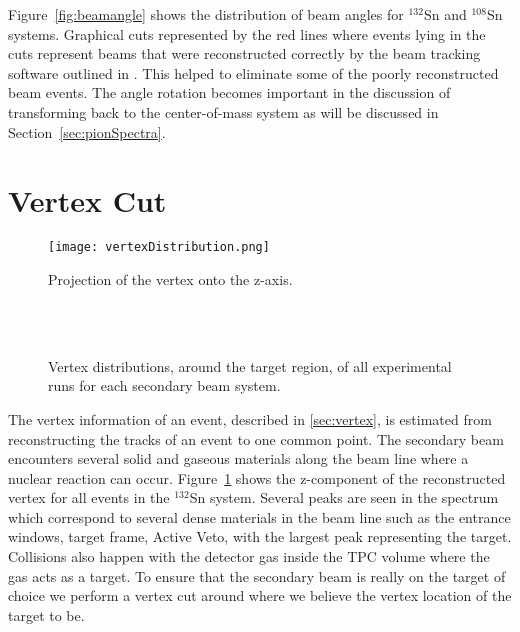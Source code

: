 Figure~\ref{fig:beamangle} shows the distribution of beam angles for ${}^{132}$Sn and ${}^{108}$Sn systems. Graphical cuts represented by the red lines where events lying in the cuts represent beams that were reconstructed correctly by the beam tracking software outlined in \cite{jon}. This helped to eliminate some of the poorly reconstructed beam events. The angle rotation becomes important in the discussion of transforming back to the center-of-mass system as will be discussed in Section~\ref{sec:pionSpectra}.



\section{Vertex Cut}
\label{sec:vertexcut}

\begin{figure}[!htb]
\centering
\texttt{[image: vertexDistribution.png]}
\caption{Projection of the vertex onto the z-axis.}
\label{fig:overviewVertex}
\end{figure}


\begin{figure}[!htb]%
    \centering
    \qquad
    \\
    \\

  	\caption{Vertex distributions, around the target region, of all experimental runs for each secondary beam system. }
	\label{fig:vertexdist}
\end{figure}


The vertex information of an event, described in \ref{sec:vertex}, is estimated from reconstructing the tracks of an event to one common point. The secondary beam encounters several solid and gaseous materials along the beam line where a nuclear reaction can occur. Figure~\ref{fig:overviewVertex} shows the z-component of the reconstructed vertex for all events in the ${}^{132}$Sn system. Several peaks are seen in the spectrum which correspond to several dense materials in the beam line such as the entrance windows, target frame, Active Veto, with the largest peak representing the target. Collisions also happen with the detector gas inside the TPC volume where the gas acts as a target. To ensure that the secondary beam is really on the target of choice we perform a vertex cut around where we believe the vertex location of the target to be.
 
